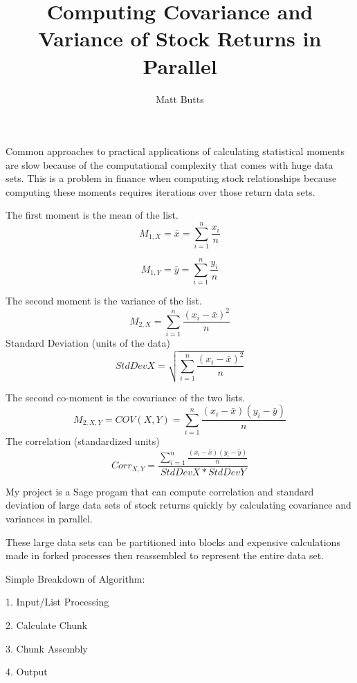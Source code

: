 \documentclass{beamer}
\title{Computing Covariance and Variance of Stock Returns in Parallel}
\author{Matt Butts}\institute{University of Washington}
\begin{document}
\begin{frame}
\titlepage
\end{frame}

\begin{frame}
Common approaches to practical applications of calculating statistical moments are slow because of the computational complexity that comes with huge data sets. This is a problem in finance when computing stock relationships because computing these moments requires iterations over those return data sets.
\end{frame}

\begin{frame}
The first moment is the mean of the list.
$$M_{1, X} = \bar{x} = \sum\limits_{i=1}^n \frac{x_i}{n}$$

$$M_{1, Y} = \bar{y} = \sum\limits_{i=1}^n \frac{y_i}{n}$$
\end{frame}

\begin{frame}
The second moment is the variance of the list.
$$M_{2, X} = \sum\limits_{i=1}^n \frac{(x_i - \bar{x})^2}{n}$$
Standard Deviation (units of the data)
$$StdDevX = \sqrt{\sum\limits_{i=1}^n \frac{(x_i - \bar{x})^2}{n}}$$
\end{frame}

\begin{frame}
The second co-moment is the covariance of the two lists.
$$M_{2, X, Y} = COV(X,Y) = \sum\limits_{i=1}^n \frac{(x_i - \bar{x})(y_i - \bar{y})}{n}$$
The correlation (standardized units)
$$Corr_{X,Y} = \frac{\sum\limits_{i=1}^n \frac{(x_i - \bar{x})(y_i - \bar{y})}{n}}{StdDevX * StdDevY}$$
\end{frame}

\begin{frame}
\textbullet My project is a Sage progam that can compute correlation and standard deviation of large data sets of stock returns quickly by calculating covariance and variances in parallel.

\textbullet These large data sets can be partitioned into blocks and expensive calculations made in forked processes then reassembled to represent the entire data set.

\end{frame}

\begin{frame}
Simple Breakdown of Algorithm:

1. Input/List Processing

2. Calculate Chunk

3. Chunk Assembly

4. Output
\end{frame}
\end{document}
